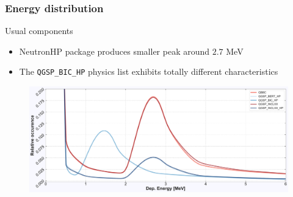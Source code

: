 \begin{frame}
\frametitle{Energy distribution}

\begin{block}{Usual components}
	\begin{itemize}
		\item NeutronHP package produces smaller peak around $2.7$ MeV
		\item The \texttt{QGSP\_BIC\_HP} physics list exhibits totally different characteristics
	\end{itemize}
\end{block}

\begin{figure}
	\includegraphics[width=\textwidth]{images/energy_dist_full_concat_E120.pdf}
\end{figure}

\end{frame}